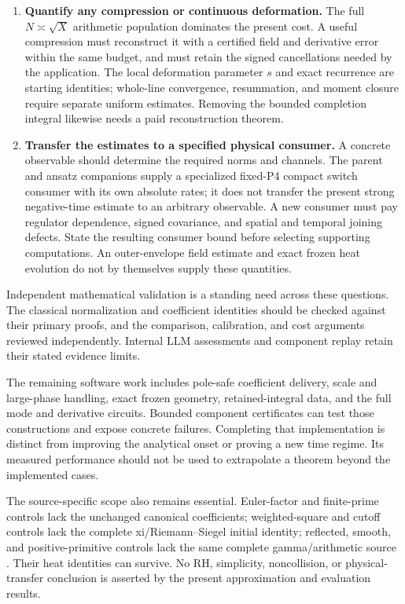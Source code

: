 \begin{enumerate}[leftmargin=*,itemsep=.65em]
\item \textbf{Quantify any compression or continuous deformation.}
The full \(N\asymp\sqrt X\) arithmetic population dominates the present
cost. A useful compression must reconstruct it with a certified field
and derivative error within the same budget, and must retain the signed
cancellations needed by the application. The local deformation parameter
\(s\) and exact recurrence are starting identities; whole-line convergence,
resummation, and moment closure require separate uniform estimates.
Removing the bounded completion integral likewise needs a paid
reconstruction theorem.

\item \textbf{Transfer the estimates to a specified physical consumer.}
A concrete observable should determine the required norms and channels.
The parent and ansatz companions supply a specialized fixed-P4 compact
switch consumer with its own absolute rates; it does not transfer the
present strong negative-time estimate to an arbitrary observable. A new
consumer must pay regulator dependence, signed covariance, and spatial
and temporal joining defects. State the resulting consumer
bound before selecting supporting computations. An outer-envelope field
estimate and exact frozen heat evolution do not by themselves supply
these quantities.
\end{enumerate}

Independent mathematical validation is a standing need across these
questions. The classical normalization and coefficient identities should
be checked against their primary proofs, and the comparison, calibration,
and cost arguments reviewed independently. Internal LLM assessments and
component replay retain their stated evidence limits.

The remaining software work includes pole-safe coefficient delivery,
scale and large-phase handling, exact frozen geometry, retained-integral
data, and the full mode and derivative circuits. Bounded component
certificates can test those constructions and expose concrete failures.
Completing that implementation is distinct from improving the analytical
onset or proving a new time regime. Its measured performance should not
be used to extrapolate a theorem beyond the implemented cases.

The source-specific scope also remains essential. Euler-factor and
finite-prime controls lack the unchanged canonical coefficients;
weighted-square and cutoff controls lack the complete xi/Riemann--Siegel
initial identity; reflected, smooth, and positive-primitive controls lack
the same complete gamma/arithmetic source \cite{controls,avoid}.
Their heat identities can survive. No RH, simplicity, noncollision,
or physical-transfer conclusion is asserted by the present approximation
and evaluation results.
